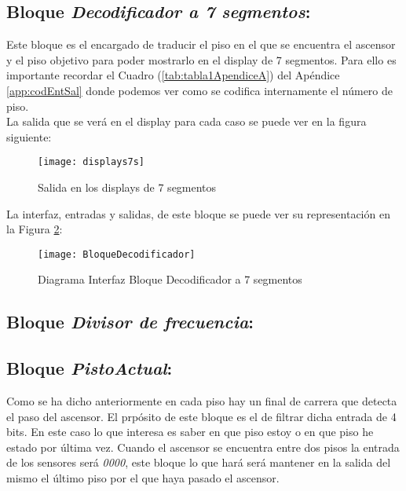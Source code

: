 \subsection{Bloque \textit{Decodificador a 7 segmentos}:}
    Este bloque es el encargado de traducir el piso en el que se encuentra el ascensor y el piso objetivo para poder mostrarlo en el display de 7 segmentos. Para ello es importante recordar el Cuadro (\ref{tab:tabla1ApendiceA}) del Apéndice \ref{app:codEntSal} donde podemos ver como se codifica internamente el número de piso. \\ 
    
    La salida que se verá en el display para cada caso se puede ver en la figura siguiente:
    
    \begin{figure}[H]
		    \centering
		    \texttt{[image: displays7s]}
		    \caption{Salida en los displays de 7 segmentos}
		    \label{fig:displays7s}
	\end{figure}
    
    La interfaz, entradas y salidas, de este bloque se puede ver su representación en la Figura \ref{fig:BloqueDecodificador7seg}:
    
    \begin{figure}[H]
		    \centering
		    \texttt{[image: BloqueDecodificador]}
		    \caption{Diagrama Interfaz Bloque Decodificador a 7 segmentos}
		    \label{fig:BloqueDecodificador7seg}
	\end{figure}
\subsection{Bloque \textit{Divisor de frecuencia}:}

\subsection{Bloque \textit{PistoActual}:}
    Como se ha dicho anteriormente en cada piso hay un final de carrera que detecta el paso del ascensor. El prpósito de este bloque es el de filtrar dicha entrada de 4 bits. En este caso lo que interesa es saber en que piso estoy o en que piso he estado por última vez. Cuando el ascensor se encuentra entre dos pisos la entrada de los sensores será \textit{0000}, este bloque lo que hará será mantener en la salida del mismo el último piso por el que haya pasado el ascensor. \\ 
    

